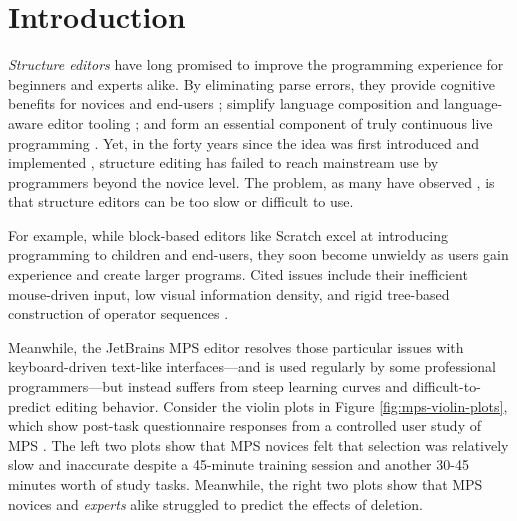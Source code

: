 \section{Introduction}\label{sec:intro}

\emph{Structure editors}
have long promised to improve the programming experience
for beginners and experts alike.
By eliminating parse errors,
they provide cognitive benefits for novices
  \cite{meta-analysis-blocks,blocks-text-high-school,coblox}
  and end-users
  \cite{weitnauer2016graspable,rousillon,BasHermans21};
  simplify language composition
  \cite{mbeddr}
  and language-aware editor tooling
  \cite{HazelnutSNAPL};
  and form an essential component of truly continuous live programming
  \cite{Hazelnut,HazelnutLive}.
Yet, in the forty years since the idea was first
introduced and implemented \cite{Cornell},
structure editing has failed to reach
mainstream use by programmers beyond the novice level.
The problem, as many have observed
\cite{user-modeling,fine-tuning-selection-semantics,
practical-lang-based-editing,lang-on-the-usefulness,
psg,Minor92,TowardUserFriendly,MillerPMV94},
is that structure editors can be too slow
or difficult to use.

For example, while
block-based editors like Scratch \cite{scratch}
excel at introducing programming
to children and end-users, they soon become unwieldy
as users gain experience and create larger programs.
Cited issues include their inefficient mouse-driven
input, low visual information density, and rigid
tree-based construction of operator sequences
\cite{BlocksFingertips,cog-dim-blocks,blocks-and-beyond,no-keyboard-cripples}.

Meanwhile, the JetBrains MPS \cite{DBLP:conf/icse/VoelterP12}
editor resolves those particular issues with
keyboard-driven text-like interfaces---and
is used regularly by some professional programmers---but
instead suffers from steep learning curves and difficult-to-predict
editing behavior.
Consider the violin plots in Figure \ref{fig:mps-violin-plots},
which show post-task questionnaire responses from
a controlled user study of MPS \cite{ProjEfficiency}.
The left two plots show that MPS novices felt that
selection was relatively slow and inaccurate despite
a 45-minute training session and another 30-45 minutes
worth of study tasks.
Meanwhile, the right two plots show that
MPS novices and \emph{experts} alike struggled to
predict the effects of deletion.


